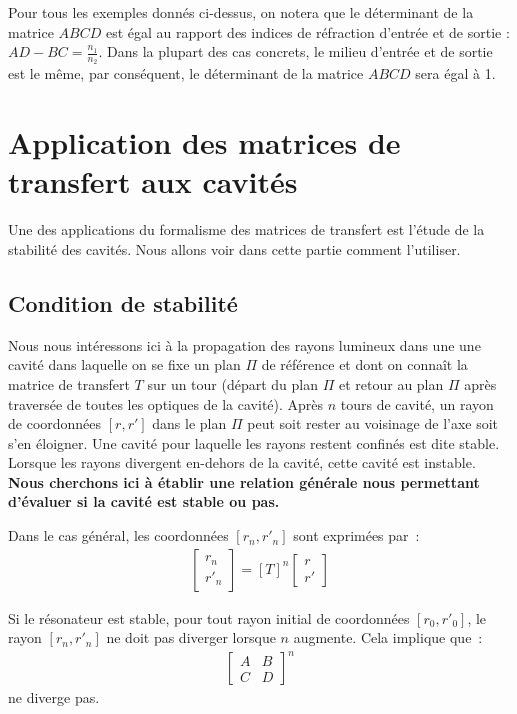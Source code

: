 \documentclass[a4paper]{book}
\begin{document}
Pour tous les exemples donnés ci-dessus, on notera que le déterminant de la matrice $ABCD$ est égal au rapport des indices de réfraction d'entrée et de sortie : $AD - BC = \frac{n_1}{n_2}$. Dans la plupart des cas concrets, le milieu d'entrée et de sortie est le même, par conséquent, le déterminant de la matrice $ABCD$ sera égal à 1.

\section{Application des matrices de transfert aux cavités}
Une des applications du formalisme des matrices de transfert est l'étude de la stabilité des cavités. Nous allons voir dans cette partie comment l'utiliser.

\subsection{Condition de stabilité}

Nous nous intéressons ici à la propagation des rayons lumineux dans une une cavité dans laquelle on se fixe un plan $\Pi$ de référence et dont on connaît la matrice de transfert $T$ sur un tour (départ du plan $\Pi$ et retour au plan $\Pi$ après traversée de toutes les optiques de la cavité).
Après $n$ tours de cavité, un rayon de coordonnées $\left[r, r'\right]$ dans le plan $\Pi$ peut soit rester au voisinage de l'axe soit s'en éloigner. Une cavité pour laquelle les rayons restent confinés est dite stable. Lorsque les rayons divergent en-dehors de la cavité, cette cavité est instable. 
\textbf{Nous cherchons ici à établir une relation générale nous permettant d'évaluer si la cavité est stable ou pas.}  

Dans le cas général, les coordonnées $\left[r_n, r'_n\right]$ sont exprimées par~:
\begin{gather}
 \begin{bmatrix} r_n \\ r'_n \end{bmatrix}
 =
\left[T\right]^n
   \begin{bmatrix} r \\ r' \end{bmatrix}
\end{gather}

Si le résonateur est stable, pour tout rayon initial de coordonnées $\left[r_0, r'_0\right]$, le rayon $\left[r_n, r'_n\right]$ ne doit pas diverger lorsque $n$ augmente. Cela implique que~:
\begin{gather}
  \begin{bmatrix}
   A & B \\
   C & D 
   \end{bmatrix}^n
\end{gather}
ne diverge pas.
\end{document}
